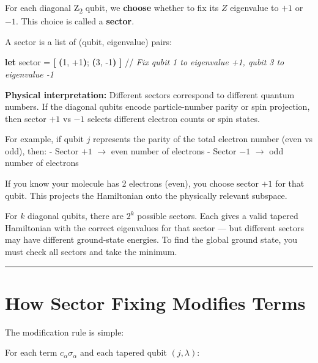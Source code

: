\documentclass[
  11pt,
  oneside]{book}
\newenvironment{Shaded}{\begin{snugshade}}{\end{snugshade}}
\newcommand{\CommentTok}[1]{\textcolor[rgb]{0.56,0.35,0.01}{\textit{#1}}}
\newcommand{\DecValTok}[1]{\textcolor[rgb]{0.00,0.00,0.81}{#1}}
\newcommand{\KeywordTok}[1]{\textcolor[rgb]{0.13,0.29,0.53}{\textbf{#1}}}
\newcommand{\NormalTok}[1]{#1}
\newcommand{\OperatorTok}[1]{\textcolor[rgb]{0.81,0.36,0.00}{\textbf{#1}}}
\begin{document}
For each diagonal Z\textsubscript{2} qubit, we \textbf{choose} whether to fix its \(Z\)
eigenvalue to \(+1\) or \(-1\). This choice is called a \textbf{sector}.

A sector is a list of (qubit, eigenvalue) pairs:

\begin{Shaded}
\begin{Highlighting}[]
\KeywordTok{let}\NormalTok{ sector = }\OperatorTok{[} \OperatorTok{(}\DecValTok{1}\NormalTok{, +}\DecValTok{1}\OperatorTok{)}\NormalTok{; }\OperatorTok{(}\DecValTok{3}\NormalTok{, }\DecValTok{{-}1}\OperatorTok{)} \OperatorTok{]}
\NormalTok{//}\CommentTok{ Fix qubit 1 to eigenvalue +1, qubit 3 to eigenvalue {-}1}
\end{Highlighting}
\end{Shaded}

\textbf{Physical interpretation:} Different sectors correspond to
different quantum numbers. If the diagonal qubits encode particle-number
parity or spin projection, then sector \(+1\) vs \(-1\) selects
different electron counts or spin states.

For example, if qubit \(j\) represents the parity of the total electron
number (even vs odd), then: - Sector \(+1\) $\rightarrow$ even number of electrons -
Sector \(-1\) $\rightarrow$ odd number of electrons

If you know your molecule has 2 electrons (even), you choose sector
\(+1\) for that qubit. This projects the Hamiltonian onto the physically
relevant subspace.

For \(k\) diagonal qubits, there are \(2^k\) possible sectors. Each
gives a valid tapered Hamiltonian with the correct eigenvalues for that
sector --- but different sectors may have different ground-state
energies. To find the global ground state, you must check all sectors
and take the minimum.

\begin{center}\rule{0.5\linewidth}{0.5pt}\end{center}

\section{How Sector Fixing Modifies
Terms}\label{how-sector-fixing-modifies-terms}

The modification rule is simple:

For each term \(c_\alpha \sigma_\alpha\) and each tapered qubit
\((j, \lambda)\):
\end{document}
